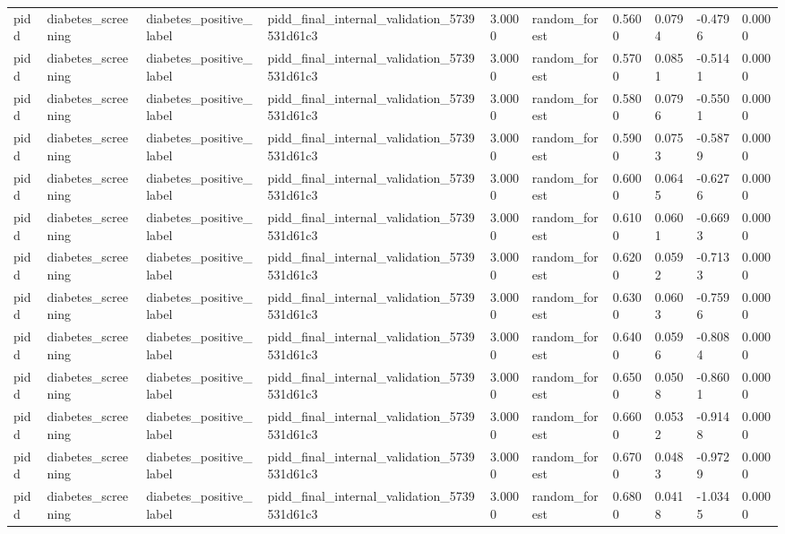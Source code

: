 \begin{tabular}{llllllllll}
pidd & diabetes\_screening & diabetes\_positive\_label & pidd\_final\_internal\_validation\_5739531d61c3 & 3.0000 & random\_forest & 0.5600 & 0.0794 & -0.4796 & 0.0000 \\
pidd & diabetes\_screening & diabetes\_positive\_label & pidd\_final\_internal\_validation\_5739531d61c3 & 3.0000 & random\_forest & 0.5700 & 0.0851 & -0.5141 & 0.0000 \\
pidd & diabetes\_screening & diabetes\_positive\_label & pidd\_final\_internal\_validation\_5739531d61c3 & 3.0000 & random\_forest & 0.5800 & 0.0796 & -0.5501 & 0.0000 \\
pidd & diabetes\_screening & diabetes\_positive\_label & pidd\_final\_internal\_validation\_5739531d61c3 & 3.0000 & random\_forest & 0.5900 & 0.0753 & -0.5879 & 0.0000 \\
pidd & diabetes\_screening & diabetes\_positive\_label & pidd\_final\_internal\_validation\_5739531d61c3 & 3.0000 & random\_forest & 0.6000 & 0.0645 & -0.6276 & 0.0000 \\
pidd & diabetes\_screening & diabetes\_positive\_label & pidd\_final\_internal\_validation\_5739531d61c3 & 3.0000 & random\_forest & 0.6100 & 0.0601 & -0.6693 & 0.0000 \\
pidd & diabetes\_screening & diabetes\_positive\_label & pidd\_final\_internal\_validation\_5739531d61c3 & 3.0000 & random\_forest & 0.6200 & 0.0592 & -0.7133 & 0.0000 \\
pidd & diabetes\_screening & diabetes\_positive\_label & pidd\_final\_internal\_validation\_5739531d61c3 & 3.0000 & random\_forest & 0.6300 & 0.0603 & -0.7596 & 0.0000 \\
pidd & diabetes\_screening & diabetes\_positive\_label & pidd\_final\_internal\_validation\_5739531d61c3 & 3.0000 & random\_forest & 0.6400 & 0.0596 & -0.8084 & 0.0000 \\
pidd & diabetes\_screening & diabetes\_positive\_label & pidd\_final\_internal\_validation\_5739531d61c3 & 3.0000 & random\_forest & 0.6500 & 0.0508 & -0.8601 & 0.0000 \\
pidd & diabetes\_screening & diabetes\_positive\_label & pidd\_final\_internal\_validation\_5739531d61c3 & 3.0000 & random\_forest & 0.6600 & 0.0532 & -0.9148 & 0.0000 \\
pidd & diabetes\_screening & diabetes\_positive\_label & pidd\_final\_internal\_validation\_5739531d61c3 & 3.0000 & random\_forest & 0.6700 & 0.0483 & -0.9729 & 0.0000 \\
pidd & diabetes\_screening & diabetes\_positive\_label & pidd\_final\_internal\_validation\_5739531d61c3 & 3.0000 & random\_forest & 0.6800 & 0.0418 & -1.0345 & 0.0000 \\

\end{tabular}
